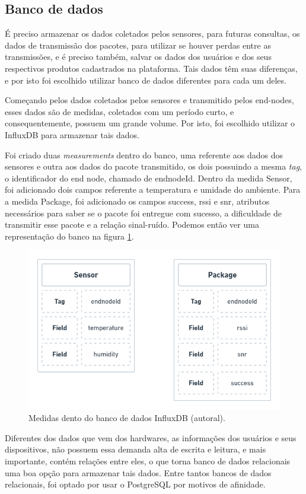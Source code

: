 \subsection{Banco de dados}
\label{metod:servidor:db}
É preciso armazenar os dados coletados pelos sensores, para futuras consultas, os dados de transmissão dos pacotes, para utilizar se houver perdas entre as transmissões, e é preciso também, salvar os dados dos usuários e dos seus respectivos produtos cadastrados na plataforma. Tais dados têm suas diferenças, e por isto foi escolhido utilizar banco de dados diferentes para cada um deles.
	
Começando pelos dados coletados pelos sensores e transmitido pelos end-nodes, esses dados são de medidas, coletados com um período curto, e consequentemente, possuem um grande volume. Por isto, foi escolhido utilizar o InfluxDB para armazenar tais dados.

Foi criado duas \textit{measurements} dentro do banco, uma referente aos dados dos sensores e outra aos dados do pacote transmitido, os dois possuindo a mesma  \textit{tag}, o identificador do end node, chamado de endnodeId. Dentro da medida Sensor, foi adicionado dois campos referente a temperatura e umidade do ambiente. Para a medida Package, foi adicionado os campos success, rssi e snr, atributos necessários para saber se o pacote foi entregue com sucesso, a dificuldade de transmitir esse pacote e a relação sinal-ruído. Podemos então ver uma representação do banco na figura \ref{fig:influxdb-model}.

\begin{figure}[H]
  \centering
  \includegraphics[width=.80\textwidth]{assets/influx-model.png} 
  \caption{Medidas dento do banco de dados InfluxDB (autoral).}
  \label{fig:influxdb-model} 
\end{figure}

Diferentes dos dados que vem dos hardwares, as informações dos usuários e seus dispositivos, não possuem essa demanda alta de escrita e leitura, e mais importante, contém relações entre eles, o que torna banco de dados relacionais uma boa opção para armazenar tais dados. Entre tantos bancos de dados relacionais, foi optado por usar o PostgreSQL por motivos de afinidade.

